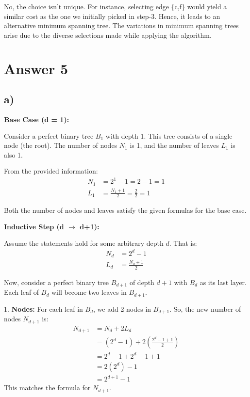 \documentclass[12pt]{article}
\begin{document}
No, the choice isn't unique. For instance, selecting edge \{c,f\} would yield a similar cost as the one we initially picked in step-3. Hence, it leads to an alternative minimum spanning tree. The variations in minimum spanning trees arise due to the diverse selections made while applying the algorithm.

\section*{Answer 5}

\subsection*{a)}

\textbf{Base Case (d = 1):}

Consider a perfect binary tree \( B_1 \) with depth 1. This tree consists of a single node (the root). The number of nodes \( N_1 \) is 1, and the number of leaves \( L_1 \) is also 1.

From the provided information:
\begin{align*}
N_1 &= 2^1 - 1 = 2 - 1 = 1 \\
L_1 &= \frac{N_1 + 1}{2} = \frac{2}{2} = 1
\end{align*}

Both the number of nodes and leaves satisfy the given formulas for the base case.

\textbf{Inductive Step (d \(\rightarrow\) d+1):}

Assume the statements hold for some arbitrary depth \( d \). That is:
\begin{align*}
N_d &= 2^d - 1 \\
L_d &= \frac{N_d + 1}{2}
\end{align*}

Now, consider a perfect binary tree \( B_{d+1} \) of depth \( d+1 \) with \( B_d \) as its last layer. Each leaf of \( B_d \) will become two leaves in \( B_{d+1} \).

1. \textbf{Nodes:} For each leaf in \( B_d \), we add 2 nodes in \( B_{d+1} \). So, the new number of nodes \( N_{d+1} \) is:
\begin{align*}
N_{d+1} &= N_d + 2L_d \\
&= (2^d - 1) + 2 \left( \frac{2^d - 1 + 1}{2} \right) \\
&= 2^d - 1 + 2^d - 1 + 1 \\
&= 2(2^d) - 1 \\
&= 2^{d+1} - 1
\end{align*}
This matches the formula for \( N_{d+1} \).
\end{document}
